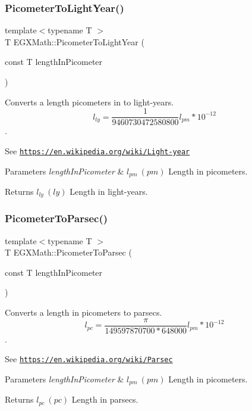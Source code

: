 \subsubsection{\texorpdfstring{Picometer\+To\+Light\+Year()}{PicometerToLightYear()}}
{\footnotesize\ttfamily template$<$typename T $>$ \\
T E\+G\+X\+Math\+::\+Picometer\+To\+Light\+Year (\begin{DoxyParamCaption}\item[{const T}]{length\+In\+Picometer }\end{DoxyParamCaption})}



Converts a length picometers in to light-\/years. \[ l_{ly}= \frac{1}{9460730472580800} l_{pm} * 10^{-12} \]. 

See \href{https://en.wikipedia.org/wiki/Light-year}{\tt https\+://en.\+wikipedia.\+org/wiki/\+Light-\/year} 
\begin{DoxyParams}{Parameters}
{\em length\+In\+Picometer} & $ l_{pm}\ (pm)$ Length in picometers. \\
\hline
\end{DoxyParams}
\begin{DoxyReturn}{Returns}
$ l_{ly}\ (ly)$ Length in light-\/years. 
\end{DoxyReturn}
\mbox{\label{group___e_g_x_math-_conversions-_length_conversions-_s_i-_picometer-_astronomical_ga3248f6de04d23f6568866a8cd80188b6}} 
\subsubsection{\texorpdfstring{Picometer\+To\+Parsec()}{PicometerToParsec()}}
{\footnotesize\ttfamily template$<$typename T $>$ \\
T E\+G\+X\+Math\+::\+Picometer\+To\+Parsec (\begin{DoxyParamCaption}\item[{const T}]{length\+In\+Picometer }\end{DoxyParamCaption})}



Converts a length in picometers to parsecs. \[ l_{pc}=\frac{\pi}{149597870700 * 648000} l_{pm} * 10^{-12} \]. 

See \href{https://en.wikipedia.org/wiki/Parsec}{\tt https\+://en.\+wikipedia.\+org/wiki/\+Parsec} 
\begin{DoxyParams}{Parameters}
{\em length\+In\+Picometer} & $ l_{pm}\ (pm)$ Length in picometers. \\
\hline
\end{DoxyParams}
\begin{DoxyReturn}{Returns}
$ l_{pc}\ (pc)$ Length in parsecs. 
\end{DoxyReturn}
